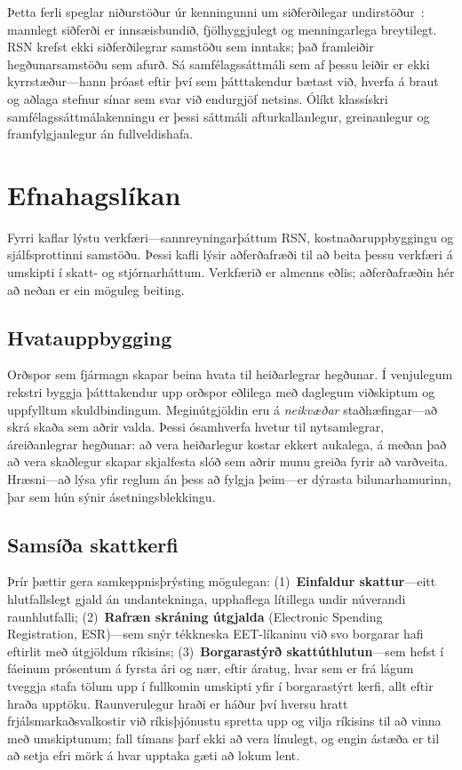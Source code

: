 \documentclass[11pt,a4paper,twocolumn]{article}
\begin{document}
Þetta ferli speglar niðurstöður úr kenningunni um siðferðilegar undirstöður~\cite{haidt2012}: mannlegt siðferði er innsæisbundið, fjölhyggjulegt og menningarlega breytilegt. RSN krefst ekki siðferðilegrar samstöðu sem inntaks; það framleiðir hegðunarsamstöðu sem afurð. Sá samfélagssáttmáli sem af þessu leiðir er ekki kyrrstæður---hann þróast eftir því sem þátttakendur bætast við, hverfa á braut og aðlaga stefnur sínar sem svar við endurgjöf netsins. Ólíkt klassískri samfélagssáttmálakenningu er þessi sáttmáli afturkallanlegur, greinanlegur og framfylgjanlegur án fullveldishafa.

\section{Efnahagslíkan}

Fyrri kaflar lýstu verkfæri---sannreyningarþáttum RSN, kostnaðaruppbyggingu og sjálfsprottinni samstöðu. Þessi kafli lýsir aðferðafræði til að beita þessu verkfæri á umskipti í skatt- og stjórnarháttum. Verkfærið er almenns eðlis; aðferðafræðin hér að neðan er ein möguleg beiting.

\subsection{Hvatauppbygging}

Orðspor sem fjármagn skapar beina hvata til heiðarlegrar hegðunar. Í venjulegum rekstri byggja þátttakendur upp orðspor eðlilega með daglegum viðskiptum og uppfylltum skuldbindingum. Meginútgjöldin eru á \emph{neikvæðar} staðhæfingar---að skrá skaða sem aðrir valda. Þessi ósamhverfa hvetur til nytsamlegrar, áreiðanlegrar hegðunar: að vera heiðarlegur kostar ekkert aukalega, á meðan það að vera skaðlegur skapar skjalfesta slóð sem aðrir munu greiða fyrir að varðveita. Hræsni---að lýsa yfir reglum án þess að fylgja þeim---er dýrasta bilunarhamurinn, þar sem hún sýnir ásetningsblekkingu.

\subsection{Samsíða skattkerfi}

Þrír þættir gera samkeppnisþrýsting mögulegan: (1)~\textbf{Einfaldur skattur}---eitt hlutfallslegt gjald án undantekninga, upphaflega lítillega undir núverandi raunhlutfalli; (2)~\textbf{Rafræn skráning útgjalda} (Electronic Spending Registration, ESR)---sem snýr tékkneska EET-líkaninu við svo borgarar hafi eftirlit með útgjöldum ríkisins; (3)~\textbf{Borgarastýrð skattúthlutun}---sem hefst í fáeinum prósentum á fyrsta ári og nær, eftir áratug, hvar sem er frá lágum tveggja stafa tölum upp í fullkomin umskipti yfir í borgarastýrt kerfi, allt eftir hraða upptöku. Raunverulegur hraði er háður því hversu hratt frjálsmarkaðsvalkostir við ríkisþjónustu spretta upp og vilja ríkisins til að vinna með umskiptunum; fall tímans þarf ekki að vera línulegt, og engin ástæða er til að setja efri mörk á hvar upptaka gæti að lokum lent.
\end{document}
